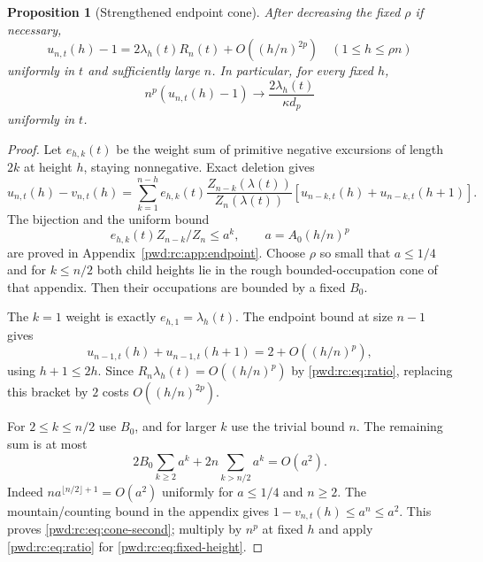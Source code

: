 \documentclass[11pt,letterpaper]{article}
\numberwithin{equation}{section}
\newtheorem{proposition}[theorem]{Proposition}
\theoremstyle{remark}\newtheorem{remark}[theorem]{Remark}
\begin{document}
\begin{proposition}[Strengthened endpoint cone]\label{pwd:rc:prop:cone}
After decreasing the fixed $\rho$ if necessary,
\begin{equation}\label{pwd:rc:eq:cone-second}
 u_{n,t}(h)-1=2\lambda_h(t)R_n(t)+O((h/n)^{2p})
 \quad(1\le h\le\rho n)
\end{equation}
uniformly in $t$ and sufficiently large $n$. In particular, for every fixed $h$,
\begin{equation}\label{pwd:rc:eq:fixed-height}
 n^p(u_{n,t}(h)-1)\longrightarrow
 \frac{2\lambda_h(t)}{\kappa d_p}
\end{equation}
uniformly in $t$.
\end{proposition}
\begin{proof}
Let $e_{h,k}(t)$ be the weight sum of primitive negative excursions of length $2k$ at height $h$, staying nonnegative. Exact deletion gives
\begin{equation}\label{pwd:rc:eq:deletion-main}
 u_{n,t}(h)-v_{n,t}(h)=\sum_{k=1}^{n-h}e_{h,k}(t)
 \frac{Z_{n-k}(\lambda(t))}{Z_n(\lambda(t))}
 [u_{n-k,t}(h)+u_{n-k,t}(h+1)].
\end{equation}
The bijection and the uniform bound
\begin{equation}\label{pwd:rc:eq:geometric-k}
 e_{h,k}(t)Z_{n-k}/Z_n\le a^k,\qquad a=A_0(h/n)^p
\end{equation}
are proved in Appendix~\ref{pwd:rc:app:endpoint}. Choose $\rho$ so small that $a\le1/4$ and for $k\le n/2$ both child heights lie in the rough bounded-occupation cone of that appendix. Then their occupations are bounded by a fixed $B_0$.

The $k=1$ weight is exactly $e_{h,1}=\lambda_h(t)$. The endpoint bound at size $n-1$ gives
\[
 u_{n-1,t}(h)+u_{n-1,t}(h+1)=2+O((h/n)^p),
\]
using $h+1\le2h$. Since $R_n\lambda_h(t)=O((h/n)^p)$ by \eqref{pwd:rc:eq:ratio}, replacing this bracket by $2$ costs $O((h/n)^{2p})$.

For $2\le k\le n/2$ use $B_0$, and for larger $k$ use the trivial bound $n$. The remaining sum is at most
\[
 2B_0\sum_{k\ge2}a^k+2n\sum_{k>n/2}a^k=O(a^2).
\]
Indeed $n a^{\lfloor n/2\rfloor+1}=O(a^2)$ uniformly for $a\le1/4$ and $n\ge2$. The mountain/counting bound in the appendix gives $1-v_{n,t}(h)\le a^n\le a^2$. This proves \eqref{pwd:rc:eq:cone-second}; multiply by $n^p$ at fixed $h$ and apply \eqref{pwd:rc:eq:ratio} for \eqref{pwd:rc:eq:fixed-height}.
\end{proof}
\end{document}

